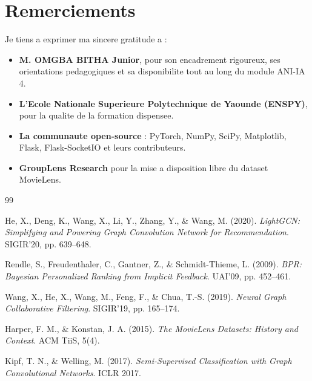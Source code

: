 \documentclass[12pt,a4paper]{report}
\begin{document}
\chapter*{Remerciements}

Je tiens a exprimer ma sincere gratitude a :

\begin{itemize}
  \item \textbf{M. OMGBA BITHA Junior}, pour son encadrement
    rigoureux, ses orientations pedagogiques et sa disponibilite
    tout au long du module ANI-IA 4.

  \item \textbf{L'Ecole Nationale Superieure Polytechnique de
    Yaounde (ENSPY)}, pour la qualite de la formation dispensee.

  \item \textbf{La communaute open-source} : PyTorch, NumPy,
    SciPy, Matplotlib, Flask, Flask-SocketIO et leurs
    contributeurs.

  \item \textbf{GroupLens Research} pour la mise a disposition
    libre du dataset MovieLens.
\end{itemize}

\begin{thebibliography}{99}

He, X., Deng, K., Wang, X., Li, Y., Zhang, Y., \& Wang, M. (2020).
\textit{LightGCN: Simplifying and Powering Graph Convolution Network
for Recommendation}. SIGIR'20, pp. 639--648.

Rendle, S., Freudenthaler, C., Gantner, Z., \& Schmidt-Thieme, L.
(2009). \textit{BPR: Bayesian Personalized Ranking from Implicit
Feedback}. UAI'09, pp. 452--461.

Wang, X., He, X., Wang, M., Feng, F., \& Chua, T.-S. (2019).
\textit{Neural Graph Collaborative Filtering}. SIGIR'19,
pp. 165--174.

Harper, F. M., \& Konstan, J. A. (2015). \textit{The MovieLens
Datasets: History and Context}. ACM TiiS, 5(4).

Kipf, T. N., \& Welling, M. (2017). \textit{Semi-Supervised
Classification with Graph Convolutional Networks}. ICLR 2017.

\end{thebibliography}
\end{document}
